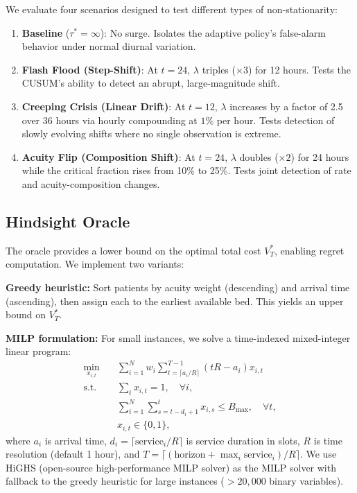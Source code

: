 \documentclass[11pt,twocolumn]{article}
\theoremstyle{plain}
\theoremstyle{definition}
\begin{document}
We evaluate four scenarios designed to test different types of non-stationarity:

\begin{enumerate}
\item \textbf{Baseline} ($\tau^* = \infty$): No surge. Isolates the adaptive policy's false-alarm behavior under normal diurnal variation.
\item \textbf{Flash Flood (Step-Shift)}: At $t = 24$, $\lambda$ triples ($\times 3$) for 12 hours. Tests the CUSUM's ability to detect an abrupt, large-magnitude shift.
\item \textbf{Creeping Crisis (Linear Drift)}: At $t = 12$, $\lambda$ increases by a factor of 2.5 over 36 hours via hourly compounding at $1\%$ per hour. Tests detection of slowly evolving shifts where no single observation is extreme.
\item \textbf{Acuity Flip (Composition Shift)}: At $t = 24$, $\lambda$ doubles ($\times 2$) for 24 hours while the critical fraction rises from 10\% to 25\%. Tests joint detection of rate and acuity-composition changes.
\end{enumerate}

\subsection{Hindsight Oracle}
\label{sec:oracle}

The oracle provides a lower bound on the optimal total cost $V^*_T$, enabling regret computation. We implement two variants:

\textbf{Greedy heuristic:} Sort patients by acuity weight (descending) and arrival time (ascending), then assign each to the earliest available bed. This yields an upper bound on $V^*_T$.

\textbf{MILP formulation:} For small instances, we solve a time-indexed mixed-integer linear program:
\begin{align}
\min_{x_{i,t}} &\quad \sum_{i=1}^{N} w_i \sum_{t = \lceil a_i / R \rceil}^{T-1} (tR - a_i) x_{i,t} \\
\text{s.t.} &\quad \sum_{t} x_{i,t} = 1, \quad \forall i, \\
&\quad \sum_{i=1}^{N} \sum_{s = t - d_i + 1}^{t} x_{i,s} \le B_{\max}, \quad \forall t, \\
&\quad x_{i,t} \in \{0, 1\},
\end{align}
where $a_i$ is arrival time, $d_i = \lceil \text{service}_i / R\rceil$ is service duration in slots, $R$ is time resolution (default 1 hour), and $T = \lceil (\text{horizon} + \max_i \text{service}_i) / R\rceil$. We use HiGHS (open-source high-performance MILP solver) as the MILP solver with fallback to the greedy heuristic for large instances ($>20{,}000$ binary variables).
\end{document}
